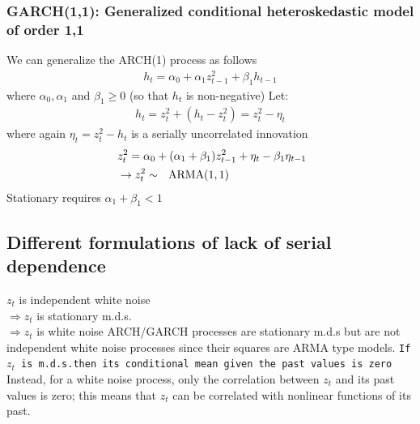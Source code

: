 \documentclass[a4paper,twoside,11pt]{article}
\begin{document}
\subsubsection{GARCH(1,1): Generalized conditional heteroskedastic model of order 1,1}
We can generalize the ARCH(1) process as follows
\begin{equation*}
\begin{aligned}
h_t = \alpha_0 + \alpha_1 z_{t-1}^2 + \beta_1 h_{t-1}
\end{aligned}
\end{equation*}
where $\alpha_0, \alpha_1$ and $\beta_1 \ge 0$ (so that $h_t$ is non-negative)
\newline
\newline
Let: 
\begin{equation*}
\begin{aligned}
h_t = z_t^2 + (h_t - z_t^2) = z_t^2 - \eta_t
\end{aligned}
\end{equation*}
where again $\eta_t = z_t^2 -h_t$ is a serially uncorrelated innovation 
\begin{equation*}
\begin{aligned}
& \ z_t^2 = \alpha_0 + (\alpha_1 + \beta_1 ) z_{t-1}^2 + \eta_t - \beta_1 \eta_{t-1} \\
& \ \rightarrow z_t^2 \sim \ \ \textmd{ARMA}(1,1)
\end{aligned}
\end{equation*}
Stationary requires $\alpha_1 + \beta_1 <1$
\subsection{Different formulations of lack of serial dependence}
\begin{shaded*}
$z_t$ is independent white noise \\
$ \Rightarrow z_t $ is stationary m.d.s. \\
$\Rightarrow z_t$ is white noise
\newline
\newline
ARCH/GARCH processes are stationary m.d.s but are not independent white noise processes since their squares are ARMA type models.
\newline
\texttt{If $z_t$ is m.d.s.then its conditional mean given the past values is zero}
\newline
Instead, for a white noise process, only the correlation between $z_t$ and its past values is zero; this means that $z_t$ can be correlated with nonlinear functions of its past.
\end{shaded*}
\end{document}
